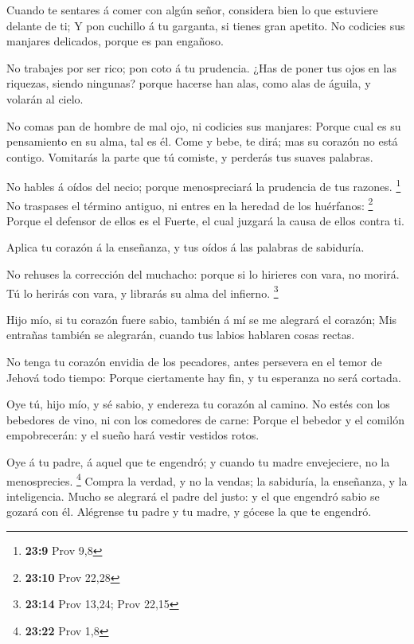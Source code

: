  Cuando te sentares á comer con algún señor, considera
bien lo que estuviere delante de ti;  Y pon cuchillo á tu
garganta, si tienes gran apetito.  No codicies sus
manjares delicados, porque es pan engañoso.

 No trabajes por ser rico; pon coto á tu prudencia.
 ¿Has de poner tus ojos en las riquezas, siendo ningunas?
porque hacerse han alas, como alas de águila, y volarán al cielo.

 No comas pan de hombre de mal ojo, ni codicies sus
manjares:  Porque cual es su pensamiento en su alma, tal
es él. Come y bebe, te dirá; mas su corazón no está contigo.
 Vomitarás la parte que tú comiste, y perderás tus suaves
palabras.

 No hables á oídos del necio; porque menospreciará la
prudencia de tus razones. \footnote{\textbf{23:9} Prov 9,8}
 No traspases el término antiguo, ni entres en la heredad
de los huérfanos: \footnote{\textbf{23:10} Prov 22,28} 
Porque el defensor de ellos es el Fuerte, el cual juzgará la causa de
ellos contra ti.

 Aplica tu corazón á la enseñanza, y tus oídos á las
palabras de sabiduría.

 No rehuses la corrección del muchacho: porque si lo
hirieres con vara, no morirá.  Tú lo herirás con vara, y
librarás su alma del infierno. \footnote{\textbf{23:14} Prov 13,24; Prov
  22,15}

 Hijo mío, si tu corazón fuere sabio, también á mí se me
alegrará el corazón;  Mis entrañas también se alegrarán,
cuando tus labios hablaren cosas rectas.

 No tenga tu corazón envidia de los pecadores, antes
persevera en el temor de Jehová todo tiempo:  Porque
ciertamente hay fin, y tu esperanza no será cortada.

 Oye tú, hijo mío, y sé sabio, y endereza tu corazón al
camino.  No estés con los bebedores de vino, ni con los
comedores de carne:  Porque el bebedor y el comilón
empobrecerán: y el sueño hará vestir vestidos rotos.

 Oye á tu padre, á aquel que te engendró; y cuando tu
madre envejeciere, no la menosprecies. \footnote{\textbf{23:22} Prov 1,8}
 Compra la verdad, y no la vendas; la sabiduría, la
enseñanza, y la inteligencia.  Mucho se alegrará el padre
del justo: y el que engendró sabio se gozará con él. 
Alégrense tu padre y tu madre, y gócese la que te engendró.

